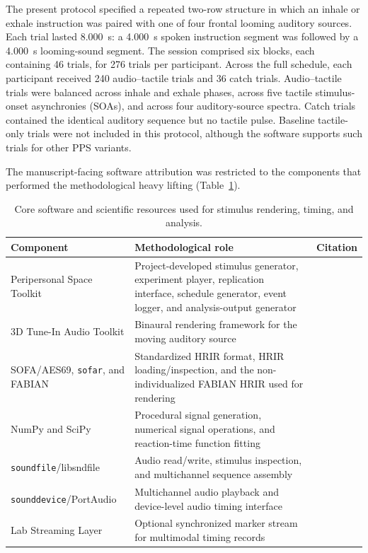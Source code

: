 The present protocol specified a repeated two-row structure in which an inhale
or exhale instruction was paired with one of four frontal looming auditory
sources. Each trial lasted 8.000~s: a 4.000~s spoken instruction segment was
followed by a 4.000~s looming-sound segment. The session comprised six blocks,
each containing 46 trials, for 276 trials per participant. Across the full
schedule, each participant received 240 audio--tactile trials and 36 catch
trials. Audio--tactile trials were balanced across inhale and exhale phases,
across five tactile stimulus-onset asynchronies (SOAs), and across four
auditory-source spectra. Catch trials contained the identical auditory sequence
but no tactile pulse. Baseline tactile-only trials were not included in this
protocol, although the software supports such trials for other PPS variants.

The manuscript-facing software attribution was restricted to the components
that performed the methodological heavy lifting (Table~\ref{tab:software-attribution}).

\begin{table}[t]
\centering
\caption{Core software and scientific resources used for stimulus rendering, timing, and analysis.}
\label{tab:software-attribution}
\begin{tabular}{p{}p{}p{}}
\toprule
Component & Methodological role & Citation \\
\midrule
Peripersonal Space Toolkit & Project-developed stimulus generator, experiment player, replication interface, schedule generator, event logger, and analysis-output generator & \citep{Fejer2026PPSToolkit} \\
3D Tune-In Audio Toolkit & Binaural rendering framework for the moving auditory source & \citep{CuevasRodriguez2019ThreeDTI} \\
SOFA/AES69, \texttt{sofar}, and FABIAN & Standardized HRIR format, HRIR loading/inspection, and the non-individualized FABIAN HRIR used for rendering & \citep{Majdak2022SOFA,Sofar2026,Brinkmann2017FABIAN} \\
NumPy and SciPy & Procedural signal generation, numerical signal operations, and reaction-time function fitting & \citep{Harris2020NumPy,Virtanen2020SciPy} \\
\texttt{soundfile}/libsndfile & Audio read/write, stimulus inspection, and multichannel sequence assembly & \citep{SoundFile2026,Libsndfile2026} \\
\texttt{sounddevice}/PortAudio & Multichannel audio playback and device-level audio timing interface & \citep{SoundDevice2026,Bencina2001PortAudio} \\
Lab Streaming Layer & Optional synchronized marker stream for multimodal timing records & \citep{Kothe2025LSL} \\
\bottomrule
\end{tabular}
\end{table}

